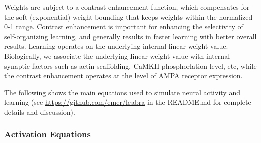 \documentclass[11pt,twoside]{article}
\newif\myifpdf
\begin{document}
Weights are subject to a contrast enhancement function, which compensates for the soft (exponential) weight bounding that keeps weights within the normalized 0-1 range. Contrast enhancement is important for enhancing the selectivity of self-organizing learning, and generally results in faster learning with better overall results. Learning operates on the underlying internal linear weight value. Biologically, we associate the underlying linear weight value with internal synaptic factors such as actin scaffolding, CaMKII phosphorlation level, etc, while the contrast enhancement operates at the level of AMPA receptor expression. 

The following shows the main equations used to simulate neural activity and learning (see \url{https://github.com/emer/leabra} in the README.md for complete details and discussion).

\subsubsection{Activation Equations}
\end{document}
